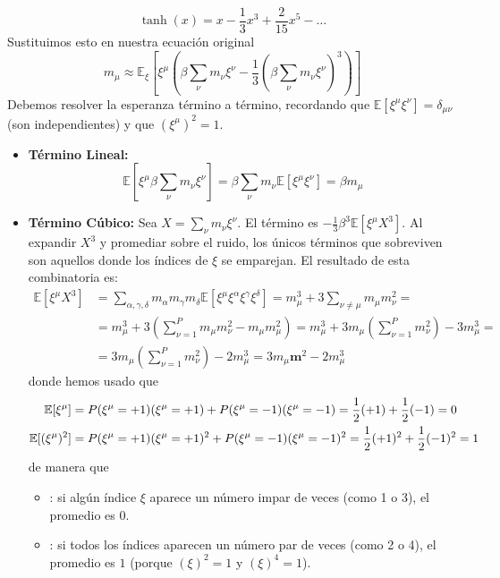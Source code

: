 \begin{equation*}
    \tanh(x) = x - \frac{1}{3}x^3 + \frac{2}{15}x^5 - \dots
\end{equation*}
Sustituimos esto en nuestra ecuación original
\begin{equation*}
    m_{\mu} \approx \mathbb{E}_{\xi} \left[ \xi^{\mu} \left( \beta \sum_{\nu} m_{\nu} \xi^{\nu} - \frac{1}{3} \left( \beta \sum_{\nu} m_{\nu} \xi^{\nu} \right)^3 \right) \right]
\end{equation*}
Debemos resolver la esperanza término a término, recordando que $\mathbb{E}[\xi^{\mu}\xi^{\nu}] = \delta_{\mu\nu}$ (son independientes) y que $(\xi^{\mu})^2 = 1$.
\begin{itemize}
    \item \textbf{Término Lineal:}
    \begin{equation*}
        \mathbb{E} [ \xi^{\mu} \beta \sum_{\nu} m_{\nu} \xi^{\nu} ] = \beta \sum_{\nu} m_{\nu} \mathbb{E}[\xi^{\mu} \xi^{\nu}] = \beta m_{\mu}
    \end{equation*}
    \item \textbf{Término Cúbico:} Sea $X = \sum_{\nu} m_{\nu} \xi^{\nu}$. El término es $-\frac{1}{3}\beta^3 \mathbb{E}[\xi^{\mu} X^3]$. Al expandir $X^3$ y promediar sobre el ruido, los únicos términos que sobreviven son aquellos donde los índices de $\xi$ se emparejan. El resultado de esta combinatoria es:
    \begin{align*}
        \mathbb{E}[\xi^{\mu} X^3] &= \sum_{\alpha, \gamma, \delta} m_{\alpha} m_{\gamma} m_{\delta} \mathbb{E}[\xi^{\mu} \xi^{\alpha} \xi^{\gamma} \xi^{\delta}]=  m_{\mu}^3 + 3 \sum_{\nu \neq \mu} m_{\mu} m_{\nu}^2= \\
        &= m_{\mu}^3 + 3 \left( \sum_{\nu=1}^P m_{\mu} m_{\nu}^2 - m_{\mu} m_{\mu}^2 \right)= m_{\mu}^3 + 3 m_{\mu} \left( \sum_{\nu=1}^P m_{\nu}^2 \right) - 3 m_{\mu}^3=\\
        &= 3 m_{\mu} \left( \sum_{\nu=1}^P m_{\nu}^2 \right) - 2 m_{\mu}^3=3 m_{\mu} \mathbf{m}^2 - 2 m_{\mu}^3
    \end{align*}
    donde hemos usado que
    \begin{align*}
        \mathbb{E}[\xi^{\mu}]&=P(\xi^{\mu}=+1)(\xi^{\mu}=+1)+P(\xi^{\mu}=-1)(\xi^{\mu}=-1)=\frac{1}{2}(+1)+\frac{1}{2}(-1)=0 \\
        \mathbb{E}[(\xi^{\mu})^2]&= P(\xi^{\mu}=+1)(\xi^{\mu}=+1)^2+P(\xi^{\mu}=-1)(\xi^{\mu}=-1)^2=\frac{1}{2}(+1)^2+\frac{1}{2}(-1)^2=1
    \end{align*}
    de manera que 
    \begin{itemize}
        \item {}: si algún índice $\xi$ aparece un número impar de veces (como 1 o 3), el promedio es $0$.
        \item {}: si todos los índices aparecen un número par de veces (como 2 o 4), el promedio es $1$ (porque $(\xi)^2 = 1$ y $(\xi)^4 = 1$).
    \end{itemize}
\end{itemize}
